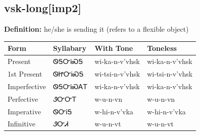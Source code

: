 \documentclass{article}%
\begin{document}
\subsection*{vsk-long[imp2]}%
\textbf{Definition: }%
he/she is sending it (refers to a flexible object)%
\\[0.5em]%
\begin{tabular}{|l|l|l|l|}%
\hline%
\textbf{Form}&\textbf{Syllabary}&\textbf{With Tone}&\textbf{Toneless}\\%
\hline%
Present&ᏫᎦᏅᎥᏍᎦ&wi{-}ka{-}n{-}v'vhsk&wi{-}ka{-}n{-}v'vhsk\\%
1st Present&ᏫᏥᏅᎥᏍᎦ&wi{-}tsi{-}n{-}v'vhsk&wi{-}tsi{-}n{-}v'vhsk\\%
Imperfective&ᏫᎦᏅᎥᏍᎪᎢ&wi{-}ka{-}n{-}v'vhsk&wi{-}ka{-}n{-}v'vhsk\\%
Perfective&ᏭᏅᏅᎢ&w{-}u{-}n{-}vn&w{-}u{-}n{-}vn\\%
Imperative&ᏫᏅᎥᎦ&w{-}hi{-}n{-}v'vka&w{-}hi{-}n{-}v'vka\\%
Infinitive&ᏭᏅᏗ&w{-}u{-}n{-}vt&w{-}u{-}n{-}vt\\%
\hline%
\end{tabular}%
\\[1em]%
\end{document}
